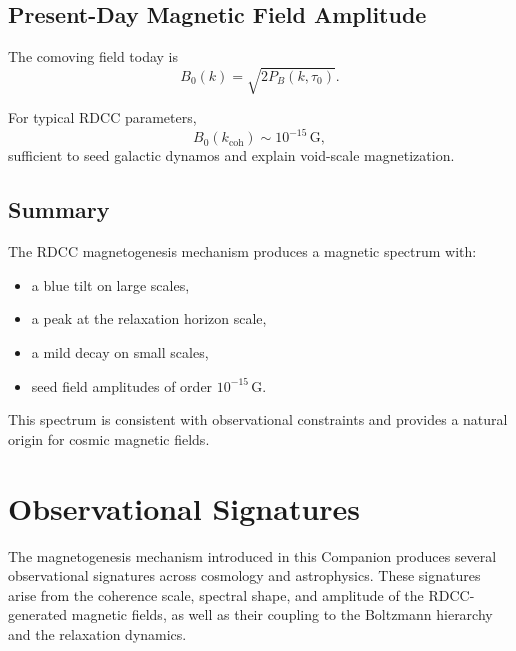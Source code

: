 \documentclass[11pt,a4paper]{article}
\begin{document}
\subsection{Present-Day Magnetic Field Amplitude}

The comoving field today is
\begin{equation}
B_{0}(k)
=
\sqrt{2P_{B}(k,\tau_{0})}.
\end{equation}

For typical RDCC parameters,
\begin{equation}
B_{0}(k_{\mathrm{coh}})
\sim
10^{-15}\,\mathrm{G},
\end{equation}
sufficient to seed galactic dynamos and explain void-scale magnetization.

\subsection{Summary}

The RDCC magnetogenesis mechanism produces a magnetic spectrum with:
\begin{itemize}
\item a blue tilt on large scales,
\item a peak at the relaxation horizon scale,
\item a mild decay on small scales,
\item seed field amplitudes of order $10^{-15}\,\mathrm{G}$.
\end{itemize}

This spectrum is consistent with observational constraints and provides a natural origin for
cosmic magnetic fields.

\section{Observational Signatures}

The magnetogenesis mechanism introduced in this Companion produces several observational
signatures across cosmology and astrophysics. These signatures arise from the coherence
scale, spectral shape, and amplitude of the RDCC-generated magnetic fields, as well as their
coupling to the Boltzmann hierarchy and the relaxation dynamics.
\end{document}
